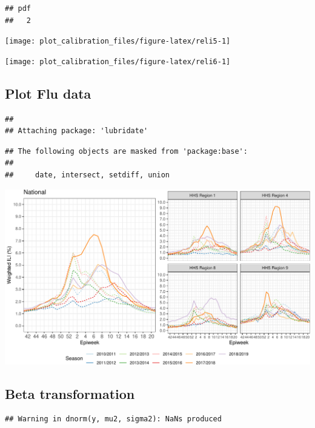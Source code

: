 \documentclass[
]{article}
\begin{document}
\begin{verbatim}
## pdf 
##   2
\end{verbatim}

\begin{center}\texttt{[image: plot\_calibration\_files/figure-latex/reli5-1]} \end{center}

\begin{center}\texttt{[image: plot\_calibration\_files/figure-latex/reli6-1]} \end{center}
\newpage

\hypertarget{plot-flu-data}{%
\subsection{Plot Flu data}\label{plot-flu-data}}

\begin{verbatim}
## 
## Attaching package: 'lubridate'
\end{verbatim}

\begin{verbatim}
## The following objects are masked from 'package:base':
## 
##     date, intersect, setdiff, union
\end{verbatim}

\begin{center}\includegraphics[width=612px]{plot_calibration_files/figure-latex/fludat2-1} \end{center}

\hypertarget{beta-transformation}{%
\subsection{Beta transformation}\label{beta-transformation}}

\begin{verbatim}
## Warning in dnorm(y, mu2, sigma2): NaNs produced
\end{verbatim}
\end{document}
